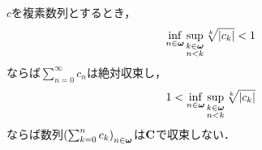 	\begin{screen}
		\begin{thm}[Cauchyの冪根判定法]
			$c$を複素数列とするとき，
			\begin{align}
				\operatorname*{inf}_{n \in {\boldsymbol \omega}} \operatorname*{sup}_{\substack{k \in {\boldsymbol \omega} \\ n < k}} \sqrt[k]{|c_{k}|} < 1
			\end{align}
			ならば$\sum_{n=0}^{\infty} c_{n}$は絶対収束し，
			\begin{align}
				1 < \operatorname*{inf}_{n \in {\boldsymbol \omega}} \operatorname*{sup}_{\substack{k \in {\boldsymbol \omega} \\ n < k}} \sqrt[k]{|c_{k}|}
			\end{align}
			ならば数列$\left(\sum_{k=0}^{n} c_{k}\right)_{n \in {\boldsymbol \omega}}$は$\mathbf{C}$で収束しない．
		\end{thm}
	\end{screen}
	
